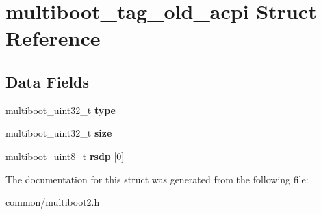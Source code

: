 \hypertarget{structmultiboot__tag__old__acpi}{}\section{multiboot\+\_\+tag\+\_\+old\+\_\+acpi Struct Reference}
\label{structmultiboot__tag__old__acpi}
\subsection*{Data Fields}
\begin{DoxyCompactItemize}
\item 
multiboot\+\_\+uint32\+\_\+t {\bfseries type}\hypertarget{structmultiboot__tag__old__acpi_a834adfc193a986e197fe5f562fd702ef}{}\label{structmultiboot__tag__old__acpi_a834adfc193a986e197fe5f562fd702ef}

\item 
multiboot\+\_\+uint32\+\_\+t {\bfseries size}\hypertarget{structmultiboot__tag__old__acpi_aef0c7ed927ee6c3c5a26f2b5623b7632}{}\label{structmultiboot__tag__old__acpi_aef0c7ed927ee6c3c5a26f2b5623b7632}

\item 
multiboot\+\_\+uint8\+\_\+t {\bfseries rsdp} \mbox{[}0\mbox{]}\hypertarget{structmultiboot__tag__old__acpi_a940cfe5894b84830464e485e0f28110e}{}\label{structmultiboot__tag__old__acpi_a940cfe5894b84830464e485e0f28110e}

\end{DoxyCompactItemize}


The documentation for this struct was generated from the following file\+:\begin{DoxyCompactItemize}
\item 
common/multiboot2.\+h\end{DoxyCompactItemize}
